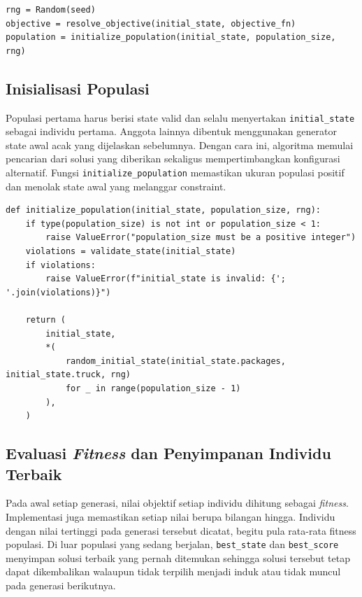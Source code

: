 \begin{lstlisting}[caption={Menyiapkan pencarian GA},label={lst:ga-setup}]
rng = Random(seed)
objective = resolve_objective(initial_state, objective_fn)
population = initialize_population(initial_state, population_size, rng)
\end{lstlisting}

\subsection{Inisialisasi Populasi}

Populasi pertama harus berisi state valid dan selalu menyertakan \texttt{initial\_state} sebagai individu pertama. Anggota lainnya dibentuk menggunakan generator state awal acak yang dijelaskan sebelumnya. Dengan cara ini, algoritma memulai pencarian dari solusi yang diberikan sekaligus mempertimbangkan konfigurasi alternatif. Fungsi \texttt{initialize\_population} memastikan ukuran populasi positif dan menolak state awal yang melanggar constraint.

\begin{lstlisting}[caption={Membangun populasi awal},label={lst:ga-initialize-population}]
def initialize_population(initial_state, population_size, rng):
    if type(population_size) is not int or population_size < 1:
        raise ValueError("population_size must be a positive integer")
    violations = validate_state(initial_state)
    if violations:
        raise ValueError(f"initial_state is invalid: {'; '.join(violations)}")

    return (
        initial_state,
        *(
            random_initial_state(initial_state.packages, initial_state.truck, rng)
            for _ in range(population_size - 1)
        ),
    )
\end{lstlisting}

\subsection{Evaluasi \textit{Fitness} dan Penyimpanan Individu Terbaik}

Pada awal setiap generasi, nilai objektif setiap individu dihitung sebagai \textit{fitness}. Implementasi juga memastikan setiap nilai berupa bilangan hingga. Individu dengan nilai tertinggi pada generasi tersebut dicatat, begitu pula rata-rata fitness populasi. Di luar populasi yang sedang berjalan, \texttt{best\_state} dan \texttt{best\_score} menyimpan solusi terbaik yang pernah ditemukan sehingga solusi tersebut tetap dapat dikembalikan walaupun tidak terpilih menjadi induk atau tidak muncul pada generasi berikutnya.

